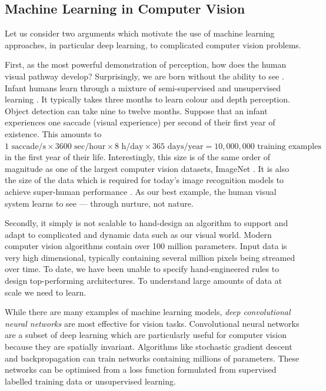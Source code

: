 \subsection{Machine Learning in Computer Vision}

Let us consider two arguments which motivate the use of machine learning approaches, in particular deep learning, to complicated computer vision problems.

First, as the most powerful demonstration of perception, how does the human visual pathway develop? Surprisingly, we are born without the ability to see \citep{gibson1960visual}. Infant humans learn through a mixture of semi-supervised and unsupervised learning \citep{kellman2006infant}. It typically takes three months to learn colour and depth perception. Object detection can take nine to twelve months. Suppose that an infant experiences one saccade (visual experience) per second of their first year of existence. This amounts to $1 \text{~saccade/s} \times 3600 \text{~sec/hour} \times 8 \text{~h/day} \times 365 \text{~days/year} = 10,000,000 \text{~training examples}$ in the first year of their life. Interestingly, this size is of the same order of magnitude as one of the largest computer vision datasets, ImageNet \citep{deng2009imagenet}. It is also the size of the data which is required for today’s image recognition models to achieve super-human performance \citep{he2016deep}. As our best example, the human visual system learns to see --- through nurture, not nature.

Secondly, it simply is not scalable to hand-design an algorithm
to support and adapt to complicated and dynamic data such as our visual world. Modern computer vision algorithms contain over 100 million parameters. Input data is very high dimensional, typically containing several million pixels being streamed over time. To date, we have been unable to specify hand-engineered rules to design top-performing architectures. To understand large amounts of data at scale we need to learn.

While there are many examples of machine learning models, \textit{deep convolutional neural networks} \citep{Fukushima1979neocognitron,krizhevsky2012imagenet} are most effective for vision tasks. Convolutional neural networks are a subset of deep learning which are particularly useful for computer vision because they are spatially invariant. Algorithms like stochastic gradient descent and backpropagation \citep{lecun88} can train networks containing millions of parameters. These networks can be optimised from a loss function formulated from supervised labelled training data or unsupervised learning.

